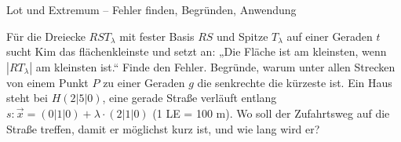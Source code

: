 \begin{aufgabe}{Lot und Extremum – Fehler finden, Begründen, Anwendung}
\begin{teile}
\teil Für die Dreiecke $RST_\lambda$ mit fester Basis $RS$ und Spitze $T_\lambda$ auf einer Geraden $t$ sucht Kim das flächenkleinste und setzt an: „Die Fläche ist am kleinsten, wenn $|RT_\lambda|$ am kleinsten ist.“ Finde den Fehler.
\teil Begründe, warum unter allen Strecken von einem Punkt $P$ zu einer Geraden $g$ die senkrechte die kürzeste ist.
\teil Ein Haus steht bei $H(2 | 5 | 0)$, eine gerade Straße verläuft entlang $s\colon \vec x = (0 | 1 | 0) + \lambda \cdot (2 | 1 | 0)$ (1 LE = 100 m). Wo soll der Zufahrtsweg auf die Straße treffen, damit er möglichst kurz ist, und wie lang wird er?
\end{teile}
\end{aufgabe}
